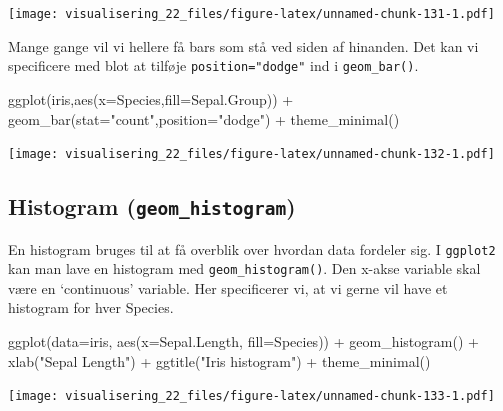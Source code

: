 \documentclass[
]{book}
\newenvironment{Shaded}{\begin{snugshade}}{\end{snugshade}}
\newcommand{\AttributeTok}[1]{\textcolor[rgb]{0.77,0.63,0.00}{#1}}
\newcommand{\FunctionTok}[1]{\textcolor[rgb]{0.00,0.00,0.00}{#1}}
\newcommand{\NormalTok}[1]{#1}
\newcommand{\SpecialCharTok}[1]{\textcolor[rgb]{0.00,0.00,0.00}{#1}}
\newcommand{\StringTok}[1]{\textcolor[rgb]{0.31,0.60,0.02}{#1}}
\begin{document}
\texttt{[image: visualisering\_22\_files/figure-latex/unnamed-chunk-131-1.pdf]}

Mange gange vil vi hellere få bars som stå ved siden af hinanden. Det kan vi specificere med blot at tilføje \texttt{position="dodge"} ind i \texttt{geom\_bar()}.

\begin{Shaded}
\begin{Highlighting}[]
\FunctionTok{ggplot}\NormalTok{(iris,}\FunctionTok{aes}\NormalTok{(}\AttributeTok{x=}\NormalTok{Species,}\AttributeTok{fill=}\NormalTok{Sepal.Group)) }\SpecialCharTok{+} 
  \FunctionTok{geom\_bar}\NormalTok{(}\AttributeTok{stat=}\StringTok{"count"}\NormalTok{,}\AttributeTok{position=}\StringTok{"dodge"}\NormalTok{) }\SpecialCharTok{+}
  \FunctionTok{theme\_minimal}\NormalTok{()}
\end{Highlighting}
\end{Shaded}

\texttt{[image: visualisering\_22\_files/figure-latex/unnamed-chunk-132-1.pdf]}

\hypertarget{histogram-geom_histogram}{%
\subsection{\texorpdfstring{Histogram (\texttt{geom\_histogram})}{Histogram (geom\_histogram)}}\label{histogram-geom_histogram}}

En histogram bruges til at få overblik over hvordan data fordeler sig. I \texttt{ggplot2} kan man lave en histogram med \texttt{geom\_histogram()}. Den x-akse variable skal være en `continuous' variable. Her specificerer vi, at vi gerne vil have et histogram for hver Species.

\begin{Shaded}
\begin{Highlighting}[]
\FunctionTok{ggplot}\NormalTok{(}\AttributeTok{data=}\NormalTok{iris, }\FunctionTok{aes}\NormalTok{(}\AttributeTok{x=}\NormalTok{Sepal.Length, }\AttributeTok{fill=}\NormalTok{Species)) }\SpecialCharTok{+} 
  \FunctionTok{geom\_histogram}\NormalTok{() }\SpecialCharTok{+} 
  \FunctionTok{xlab}\NormalTok{(}\StringTok{"Sepal Length"}\NormalTok{) }\SpecialCharTok{+} 
  \FunctionTok{ggtitle}\NormalTok{(}\StringTok{"Iris histogram"}\NormalTok{) }\SpecialCharTok{+} 
  \FunctionTok{theme\_minimal}\NormalTok{()}
\end{Highlighting}
\end{Shaded}

\texttt{[image: visualisering\_22\_files/figure-latex/unnamed-chunk-133-1.pdf]}
\end{document}
